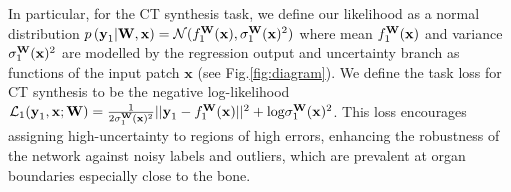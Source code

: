 In particular, for the CT synthesis task, we define our likelihood as a normal distribution $p\left(\text{\textbf{y}}_{1}|\mathbf{W},\mathbf{x}\right) = \mathcal{N}(f^{\text{\textbf{W}}}_1(\text{\textbf{x}}), \sigma_{1}^{\text{\textbf{W}}}(\text{\textbf{x}})^{2})$
where mean $f^{\text{\textbf{W}}}_1(\text{\textbf{x}})$ and variance $\sigma_{1}^{\text{\textbf{W}}}(\text{\textbf{x}})^{2}$ are modelled by the regression output and uncertainty branch as functions of the input patch $\mathbf{x}$ (see Fig.\ref{fig:diagram}). We define the task loss for CT synthesis to be the negative log-likelihood $\mathcal{L}_{1}(\text{\textbf{y}}_{1},\mathbf{x};\mathbf{W})= \frac{1}{2\sigma_{1}^{\text{\textbf{W}}}(\text{\textbf{x}})^{2}}||\text{\textbf{y}}_{1}-f^{\text{\textbf{W}}}_1(\text{\textbf{x}})||^{2} + \text{log}\sigma_{1}^{\text{\textbf{W}}}(\text{\textbf{x}})^{2}$. This loss encourages assigning high-uncertainty to regions of high errors, enhancing the robustness of the network against noisy labels and outliers, which are prevalent at organ boundaries especially close to the bone.

